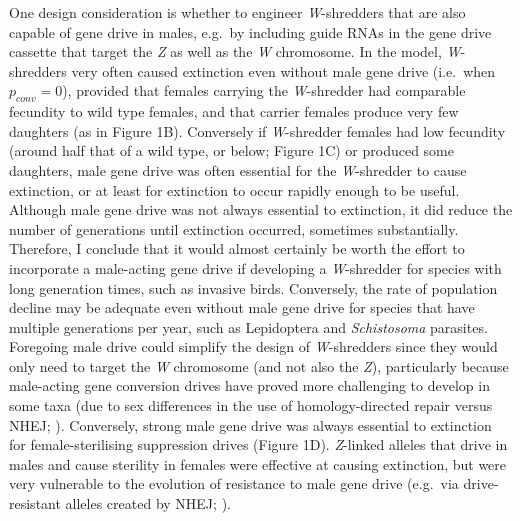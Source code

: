 \documentclass[]{rsos}%
\begin{document}
One design consideration is whether to engineer \emph{W}-shredders that
are also capable of gene drive in males, e.g.~by including guide RNAs in
the gene drive cassette that target the \emph{Z} as well as the \emph{W}
chromosome. In the model, \emph{W}-shredders very often caused
extinction even without male gene drive (i.e.~when \(p_{conv} = 0\)),
provided that females carrying the \emph{W}-shredder had comparable
fecundity to wild type females, and that carrier females produce very
few daughters (as in Figure 1B). Conversely if \emph{W}-shredder females
had low fecundity (around half that of a wild type, or below; Figure 1C)
or produced some daughters, male gene drive was often essential for the
\emph{W}-shredder to cause extinction, or at least for extinction to
occur rapidly enough to be useful. Although male gene drive was not
always essential to extinction, it did reduce the number of generations
until extinction occurred, sometimes substantially. Therefore, I
conclude that it would almost certainly be worth the effort to
incorporate a male-acting gene drive if developing a \emph{W}-shredder
for species with long generation times, such as invasive birds.
Conversely, the rate of population decline may be adequate even without
male gene drive for species that have multiple generations per year,
such as Lepidoptera and \emph{Schistosoma} parasites. Foregoing male
drive could simplify the design of \emph{W}-shredders since they would
only need to target the \emph{W} chromosome (and not also the \emph{Z}),
particularly because male-acting gene conversion drives have proved more
challenging to develop in some taxa (due to sex differences in the use
of homology-directed repair versus NHEJ; \citep{grunwald2019super}).
Conversely, strong male gene drive was always essential to extinction
for female-sterilising suppression drives (Figure 1D). \emph{Z}-linked
alleles that drive in males and cause sterility in females were
effective at causing extinction, but were very vulnerable to the
evolution of resistance to male gene drive (e.g.~via drive-resistant
alleles created by NHEJ; \citep{unckless2017ev}).
\end{document}
